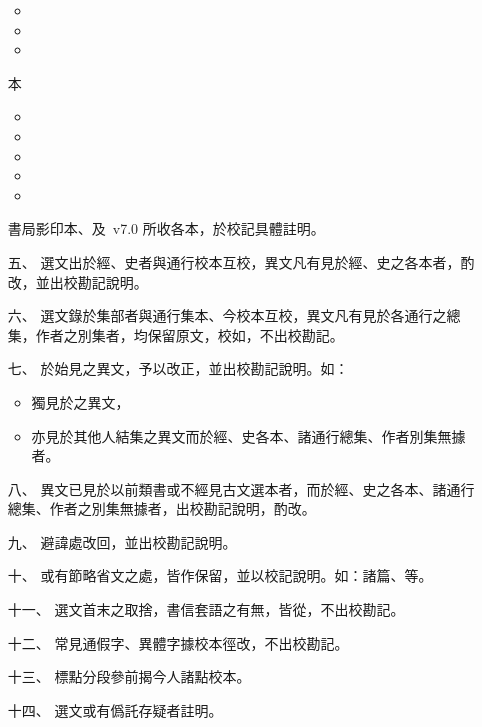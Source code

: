 \begin{enumerate}
\begin{itemize}
        \item {}
        \item {}
        \item {}
    \end{itemize}
    本
    \begin{itemize}
        \item {}
        \item {}
        \item {}
        \item {}
        \item {}
    \end{itemize}
    書局影印本、及\ v7.0 所收各本，於校記具體註明。
    \item[五、] 選文出於經、史者與通行校本互校，異文凡有見於經、史之各本者，酌改，並出校勘記說明。
    \item[六、] 選文錄於集部者與通行集本、今校本互校，異文凡有見於各通行之總集，作者之別集者，均保留原文，校如，不出校勘記。
    \item[七、] 於始見之異文，予以改正，並出校勘記說明。如：\begin{itemize}
        \item 獨見於之異文，
        \item 亦見於其他人結集之異文而於經、史各本、諸通行總集、作者別集無據者。
    \end{itemize}
    \item[八、] 異文已見於以前類書或不經見古文選本者，而於經、史之各本、諸通行總集、作者之別集無據者，出校勘記說明，酌改。
    \item[九、] 避諱處改回，並出校勘記說明。
    \item[十、] 或有節略省文之處，皆作保留，並以校記說明。如：諸篇、等。
    \item[十一、] 選文首末之取捨，書信套語之有無，皆從，不出校勘記。
    \item[十二、] 常見通假字、異體字據校本徑改，不出校勘記。
    \item[十三、] 標點分段參前揭今人諸點校本。
    \item[十四、] 選文或有僞託存疑者註明。 
\end{enumerate}
  